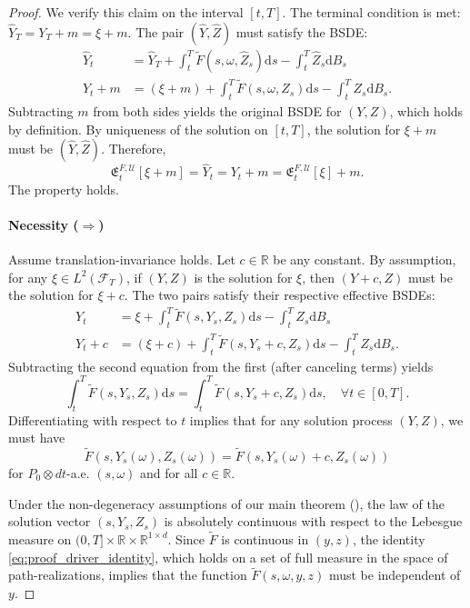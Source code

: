 \documentclass[12pt, letterpaper]{amsart}
\newcommand{\Efrak}{\mathfrak{E}}
\newcommand{\Efrakgen}{\Efrak^{F, \Ucal}}
\newcommand{\Ucal}{\mathcal{U}}
\newcommand{\R}{\mathbb{R}}
\newcommand{\dd}{\mathrm{d}}
\theoremstyle{plain}
\theoremstyle{definition}
\theoremstyle{remark}
\numberwithin{equation}{section} %
\begin{document}
\begin{proof}
We verify this claim on the interval $[t,T]$. The terminal condition is met: $\hat{Y}_T = Y_T + m = \xi + m$. The pair $(\hat{Y}, \hat{Z})$ must satisfy the BSDE:
\begin{align*}
    \hat{Y}_t &= \hat{Y}_T + \int_t^T \tilde{F}(s, \omega, \hat{Z}_s) \dd s - \int_t^T \hat{Z}_s \dd B_s \\
    Y_t + m &= (\xi + m) + \int_t^T \tilde{F}(s, \omega, Z_s) \dd s - \int_t^T Z_s \dd B_s.
\end{align*}
Subtracting $m$ from both sides yields the original BSDE for $(Y,Z)$, which holds by definition. By uniqueness of the solution on $[t,T]$, the solution for $\xi+m$ must be $(\hat{Y}, \hat{Z})$. Therefore,
\begin{equation*}
    \Efrakgen_t[\xi+m] = \hat{Y}_t = Y_t + m = \Efrakgen_t[\xi] + m.
\end{equation*}
The property holds.

\paragraph{\textbf{Necessity ($\Rightarrow$)}} Assume translation-invariance holds. Let $c \in \R$ be any constant. By assumption, for any $\xi \in L^2(\mathcal{F}_T)$, if $(Y,Z)$ is the solution for $\xi$, then $(Y+c, Z)$ must be the solution for $\xi+c$. The two pairs satisfy their respective effective BSDEs:
\begin{align*}
    Y_t &= \xi + \int_t^T \tilde{F}(s, Y_s, Z_s) \dd s - \int_t^T Z_s \dd B_s \\
    Y_t+c &= (\xi+c) + \int_t^T \tilde{F}(s, Y_s+c, Z_s) \dd s - \int_t^T Z_s \dd B_s.
\end{align*}
Subtracting the second equation from the first (after canceling terms) yields
\begin{equation*}
    \int_t^T \tilde{F}(s, Y_s, Z_s) \dd s = \int_t^T \tilde{F}(s, Y_s+c, Z_s) \dd s, \quad \forall t \in [0,T].
\end{equation*}
Differentiating with respect to $t$ implies that for any solution process $(Y,Z)$, we must have
\begin{equation} \label{eq:proof_driver_identity}
    \tilde{F}(s, Y_s(\omega), Z_s(\omega)) = \tilde{F}(s, Y_s(\omega)+c, Z_s(\omega))
\end{equation}
for $P_0 \otimes dt$-a.e. $(s,\omega)$ and for all $c \in \R$.

Under the non-degeneracy assumptions of our main theorem (), the law of the solution vector $(s, Y_s, Z_s)$ is absolutely continuous with respect to the Lebesgue measure on $(0,T] \times \R \times \R^{1\times d}$. Since $\tilde{F}$ is continuous in $(y,z)$, the identity \eqref{eq:proof_driver_identity}, which holds on a set of full measure in the space of path-realizations, implies that the function $\tilde{F}(s,\omega,y,z)$ must be independent of $y$.


\end{proof}
\end{document}
